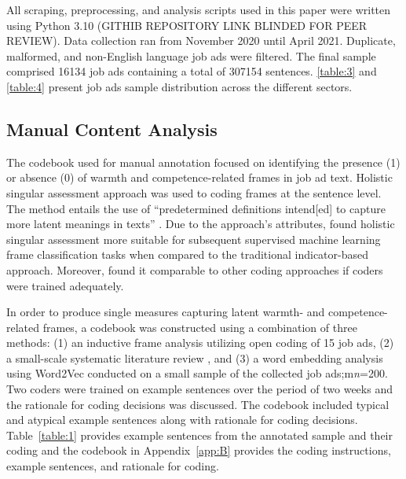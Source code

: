 \documentclass[man]{apa7}
\begin{document}
All scraping, preprocessing, and analysis scripts used in this paper were written using Python 3.10 (GITHIB REPOSITORY LINK BLINDED FOR PEER REVIEW). Data collection ran from November 2020 until April 2021. Duplicate, malformed, and non-English language job ads were filtered. The final sample comprised 16134 job ads containing a total of 307154 sentences. \ref{table:3} and \ref{table:4} present job ads sample distribution across the different sectors.

\subsection{Manual Content Analysis}
\label{ca}
The codebook used for manual annotation focused on identifying the presence (1) or absence (0) of warmth and competence-related frames in job ad text. Holistic singular assessment approach was used to coding frames at the sentence level. The method entails the use of “predetermined definitions intend[ed] to capture more latent meanings in texts” \parencite[p. 332]{wright_framework_2011}. Due to the approach’s attributes, \Textcite{burscher_teaching_2014} found holistic singular assessment more suitable for subsequent supervised machine learning frame classification tasks when compared to the traditional indicator-based approach. Moreover, \Textcite{wright_framework_2011} found it comparable to other coding approaches if coders were trained adequately.

In order to produce single measures capturing latent warmth- and competence-related frames, a codebook was constructed using a combination of three methods: (1) an inductive frame analysis utilizing open coding of 15 job ads, (2) a small-scale systematic literature review , and (3) a word embedding analysis using Word2Vec conducted on a small sample of the collected job ads;m\textit{n}=200. Two coders were trained on example sentences over the period of two weeks and the rationale for coding decisions was discussed. The codebook included typical and atypical example sentences along with rationale for coding decisions. Table~\ref{table:1} provides example sentences from the annotated sample and their coding and the codebook in Appendix~\ref{app:B} provides the coding instructions, example sentences, and rationale for coding.
\end{document}
